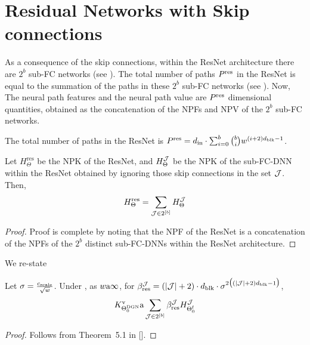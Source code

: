 \section{Residual Networks with Skip connections}

As a consequence of the skip connections, within the ResNet architecture there are $2^b$ sub-FC networks (see ). The total number of paths $P^{\text{res}}$ in the ResNet is equal to the summation of the paths in these $2^b$ sub-FC networks (see ). Now, The neural path features and the neural path value are $P^{\text{res}}$ dimensional quantities, obtained as the concatenation of the NPFs and NPV of the $2^b$ sub-FC networks. 

\begin{proposition}\label{prop:resnetpath}
The total number of paths in the ResNet is  $P^{\text{res}} = d_{\text{in}} \cdot\sum_{i=0}^b \binom{b}{i} w^{(i+2)d_{\text{blk}}-1}$.
\end{proposition}

\begin{lemma}\label{lm:sumofproduct}
Let $H^{\text{res}}_{\Theta}$ be the NPK of the ResNet, and $H^{\mathcal{J}}_{\Theta}$ be the NPK of the sub-FC-DNN within the ResNet obtained by ignoring those skip connections in the set $\mathcal{J}$. Then, \begin{align*}H^{\text{res}}_{\Theta}=\sum_{\mathcal{J}\in 2^{[b]}}H^{\mathcal{J}}_{\Theta}\end{align*}
\end{lemma}
\begin{proof}
Proof is complete by noting that the NPF of the ResNet is a concatenation of the NPFs of the $2^b$ distinct sub-FC-DNNs within the ResNet architecture.
\end{proof}

We re-state 
\begin{theorem} Let $\sigma=\frac{c_{\text{scale}}}{\sqrt{w}}$. Under , as $w{\textnormal{a}}\infty$,  for $\beta_{\text{res}}^{\mathcal{J}} = (|\mathcal{J}| +2)\cdot d_{\text{blk}}\cdot \sigma^{2\big( (|\mathcal{J}|+2)d_{\text{blk}}-1\big)}$,
\begin{align*}
K^{\text{v}}_{\Theta^{\text{DGN}}_0}{\textnormal{a}} \sum_{\mathcal{J}\in 2^{[b]}}  \beta_{\text{res}}^{\mathcal{J}} H^{\mathcal{J}}_{\Theta^{\textrm{f}}_0}
\end{align*}
\end{theorem}


\begin{proof}
Follows from Theorem~5.1 in [].
\end{proof}


